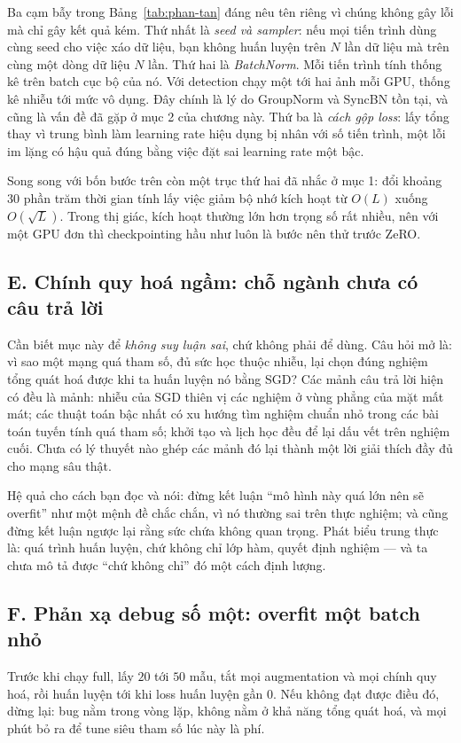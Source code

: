 \documentclass[../../../deep_learning.tex]{subfiles}
\begin{document}
Ba cạm bẫy trong Bảng~\ref{tab:phan-tan} đáng nêu tên riêng vì chúng không gây lỗi mà chỉ gây kết quả kém. Thứ nhất là \emph{seed và sampler}: nếu mọi tiến trình dùng cùng seed cho việc xáo dữ liệu, bạn không huấn luyện trên \(N\) lần dữ liệu mà trên cùng một dòng dữ liệu \(N\) lần. Thứ hai là \emph{BatchNorm}. Mỗi tiến trình tính thống kê trên batch cục bộ của nó. Với detection chạy một tới hai ảnh mỗi GPU, thống kê nhiễu tới mức vô dụng. Đây chính là lý do GroupNorm và SyncBN tồn tại, và cũng là vấn đề đã gặp ở mục 2 của chương này. Thứ ba là \emph{cách gộp loss}: lấy tổng thay vì trung bình làm learning rate hiệu dụng bị nhân với số tiến trình, một lỗi im lặng có hậu quả đúng bằng việc đặt sai learning rate một bậc.

Song song với bốn bước trên còn một trục thứ hai đã nhắc ở mục 1:  \cite{chen2016training} đổi khoảng \(30\) phần trăm thời gian tính lấy việc giảm bộ nhớ kích hoạt từ \(O(L)\) xuống \(O(\sqrt{L})\). Trong thị giác, kích hoạt thường lớn hơn trọng số rất nhiều, nên với một GPU đơn thì checkpointing hầu như luôn là bước nên thử trước ZeRO.

\subsection{E. Chính quy hoá ngầm: chỗ ngành chưa có câu trả lời}
Cần biết mục này để \emph{không suy luận sai}, chứ không phải để dùng. Câu hỏi mở là: vì sao một mạng quá tham số, đủ sức học thuộc nhiễu, lại chọn đúng nghiệm tổng quát hoá được khi ta huấn luyện nó bằng SGD? Các mảnh câu trả lời hiện có đều là mảnh: nhiễu của SGD thiên vị các nghiệm ở vùng phẳng của mặt mất mát; các thuật toán bậc nhất có xu hướng tìm nghiệm chuẩn nhỏ trong các bài toán tuyến tính quá tham số; khởi tạo và lịch học đều để lại dấu vết trên nghiệm cuối. Chưa có lý thuyết nào ghép các mảnh đó lại thành một lời giải thích đầy đủ cho mạng sâu thật.

Hệ quả cho cách bạn đọc và nói: đừng kết luận ``mô hình này quá lớn nên sẽ overfit'' như một mệnh đề chắc chắn, vì nó thường sai trên thực nghiệm; và cũng đừng kết luận ngược lại rằng sức chứa không quan trọng. Phát biểu trung thực là: quá trình huấn luyện, chứ không chỉ lớp hàm, quyết định nghiệm --- và ta chưa mô tả được ``chứ không chỉ'' đó một cách định lượng.

\subsection{F. Phản xạ debug số một: overfit một batch nhỏ}
Trước khi chạy full, lấy \(20\) tới \(50\) mẫu, tắt mọi augmentation và mọi chính quy hoá, rồi huấn luyện tới khi loss huấn luyện gần \(0\). Nếu không đạt được điều đó, dừng lại: bug nằm trong vòng lặp, không nằm ở khả năng tổng quát hoá, và mọi phút bỏ ra để tune siêu tham số lúc này là phí.
\end{document}
